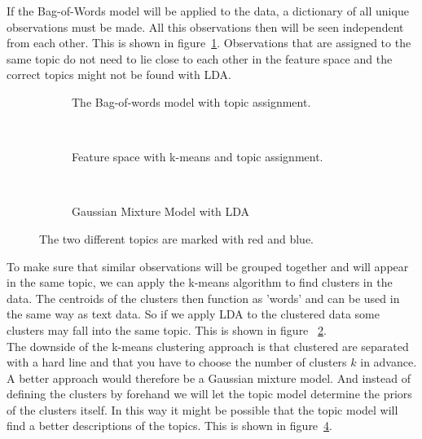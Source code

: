 \documentclass[11pt,a4paper]{article}
\begin{document}
If the Bag-of-Words model will be applied to the data, a dictionary of all unique observations must be made. All this observations then will be seen independent from each other. This is shown in figure~\ref{fig:FSBOW}. Observations that are assigned to the same topic do not need to lie close to each other in the feature space and the correct topics might not be found with LDA.

\begin{figure}[h!]
\centering
\begin{subfigure}[b]{0.3\linewidth}
\centering
\def\svgwidth{140pt}

\caption{The Bag-of-words model with topic assignment.}
\label{fig:FSBOW}
\end{subfigure}
~
\begin{subfigure}[b]{0.3\linewidth}
\centering
\def\svgwidth{140pt}

\caption{Feature space with k-means and topic assignment.}
\label{fig:FSk-means}
\end{subfigure}
~
\begin{subfigure}[b]{0.3\textwidth}
\centering
\def\svgwidth{140pt}

\caption{Gaussian Mixture Model with LDA}
\label{fig:GMM+LDA}
\end{subfigure}
\caption{The two different topics are marked with red and blue.}
\end{figure}

To make sure that similar observations will be grouped together and will appear in the same topic, we can apply the k-means algorithm to find clusters in the data. The centroids of the clusters then function as 'words' and can be used in the same way as text data. So if we apply LDA to the clustered data some clusters may fall into the same topic. This is shown in figure ~\ref{fig:FSk-means}.\\
The downside of the k-means clustering approach is that clustered are separated with a hard line and that you have to choose the number of clusters $k$ in advance. A better approach would therefore be a Gaussian mixture model. And instead of defining the clusters by forehand we will let the topic model determine the priors of the clusters itself. In this way it might be possible that the topic model will find a better descriptions of the topics. This is shown in figure~\ref{fig:GMM+LDA}.



% 
\end{document}
